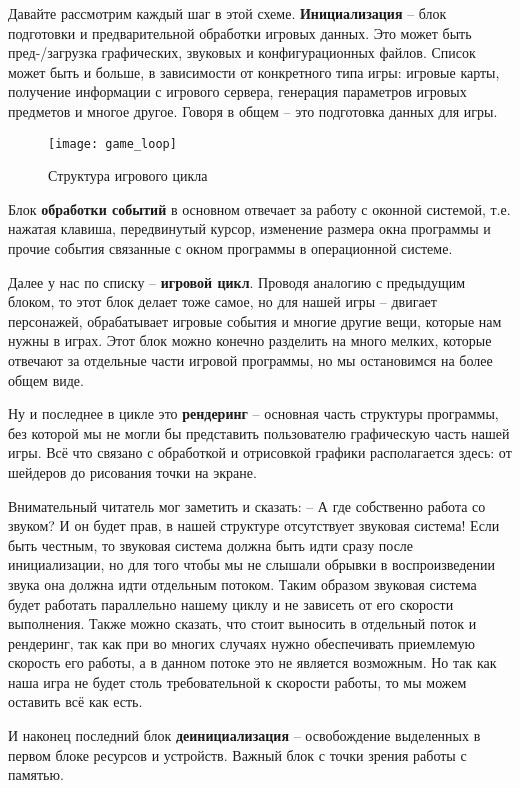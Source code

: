 Давайте рассмотрим каждый шаг в этой схеме. \textbf{Инициализация} -- блок подготовки и предварительной 
обработки игровых данных. Это может быть пред-/загрузка графических, звуковых и конфигурационных файлов. 
Список может быть и больше, в зависимости от конкретного типа игры: игровые карты, получение информации с 
игрового сервера, генерация параметров игровых предметов и многое другое. Говоря в общем -- это подготовка 
данных для игры.

\begin{wrapfigure}[18]{r}{0.22\linewidth}
    \texttt{[image: game\_loop]}
    \caption{Структура игрового цикла}
    \label{img:skeleton}
\end{wrapfigure}

Блок \textbf{обработки событий} в основном отвечает за работу с оконной системой, т.е. нажатая клавиша, 
передвинутый курсор, изменение размера окна программы и прочие события связанные с окном программы в 
операционной системе. 

Далее у нас по списку -- \textbf{игровой цикл}. Проводя аналогию с предыдущим блоком, то этот блок делает 
тоже самое, но для нашей игры -- двигает персонажей, обрабатывает игровые события и многие другие вещи, 
которые нам нужны в играх. Этот блок можно конечно разделить на много мелких, которые отвечают за отдельные 
части игровой программы, но мы остановимся на более общем виде. 

Ну и последнее в цикле это \textbf{рендеринг} -- основная часть структуры программы, без которой мы не могли 
бы представить пользователю графическую часть нашей игры. Всё что связано с обработкой и отрисовкой графики 
располагается здесь: от шейдеров до рисования точки на экране.

Внимательный читатель мог заметить и сказать: -- А где собственно работа со звуком? И он будет прав, в нашей 
структуре отсутствует звуковая система! Если быть честным, то звуковая система должна быть идти сразу после 
инициализации, но для того чтобы мы не слышали обрывки в воспроизведении звука она должна идти отдельным 
потоком. Таким образом звуковая система будет работать параллельно нашему циклу и не зависеть от его скорости 
выполнения. Также можно сказать, что стоит выносить в отдельный поток и рендеринг, так как при во многих 
случаях нужно обеспечивать приемлемую скорость его работы, а в данном потоке это не является возможным. Но 
так как наша игра не будет столь требовательной к скорости работы, то мы можем оставить всё как есть.

И наконец последний блок \textbf{деинициализация} -- освобождение выделенных в первом блоке ресурсов и 
устройств. Важный блок с точки зрения работы с памятью.

